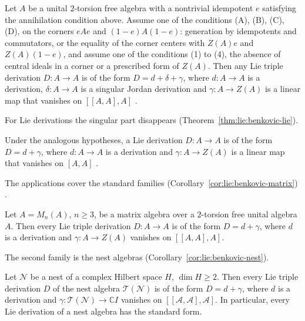 \begin{theorem}\label{thm:lie:benkovic-triple}
Let $A$ be a unital $2$-torsion free algebra with a nontrivial idempotent $e$
satisfying the annihilation condition above. Assume one of the conditions
\textup{(A)}, \textup{(B)}, \textup{(C)}, \textup{(D)}, on the corners $eAe$
and $(1-e)A(1-e)$: generation by idempotents and commutators, or the equality
of the corner centers with $Z(A)e$ and $Z(A)(1-e)$, and assume one of the
conditions \textup{(1)} to \textup{(4)}, the absence of central ideals in a
corner or a prescribed form of $Z(A)$. Then any Lie triple derivation
$D\colon A\to A$ is of the form $D=d+\delta+\gamma$, where $d\colon A\to A$
is a derivation, $\delta\colon A\to A$ is a singular Jordan derivation and
$\gamma\colon A\to Z(A)$ is a linear map that vanishes on $[[A,A],A]$
\cite[p.~159]{Benkovic2015}.
\end{theorem}

For Lie derivations the singular part disappears (Theorem~\ref{thm:lie:benkovic-lie}).

\begin{theorem}\label{thm:lie:benkovic-lie}
Under the analogous hypotheses, a Lie derivation $D\colon A\to A$ is of the
form $D=d+\gamma$, where $d\colon A\to A$ is a derivation and
$\gamma\colon A\to Z(A)$ is a linear map that vanishes on $[A,A]$
\cite[p.~160]{Benkovic2015}.
\end{theorem}

The applications cover the standard families (Corollary~\ref{cor:lie:benkovic-matrix}) \cite[pp.~161--163]{Benkovic2015}.

\begin{corollary}\label{cor:lie:benkovic-matrix}
Let $A=M_{n}(A)$, $n\ge3$, be a matrix algebra over a $2$-torsion free unital
algebra $A$. Then every Lie triple derivation $D\colon A\to A$ is of the form
$D=d+\gamma$, where $d$ is a derivation and $\gamma\colon A\to Z(A)$ vanishes
on $[[A,A],A]$.
\end{corollary}

The second family is the nest algebras (Corollary~\ref{cor:lie:benkovic-nest}).

\begin{corollary}\label{cor:lie:benkovic-nest}
Let $\mathcal{N}$ be a nest of a complex Hilbert space $H$, $\dim H\ge2$. Then
every Lie triple derivation $D$ of the nest algebra $\mathcal{T}(\mathcal{N})$
is of the form $D=d+\gamma$, where $d$ is a derivation and
$\gamma\colon\mathcal{T}(\mathcal{N})\to\mathbb{C}I$ vanishes on
$[[\mathcal{A},\mathcal{A}],\mathcal{A}]$. In particular, every Lie derivation
of a nest algebra has the standard form.
\end{corollary}

